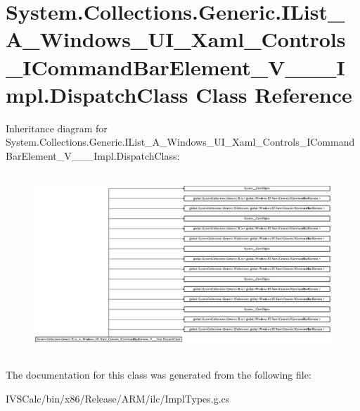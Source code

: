 \hypertarget{class_system_1_1_collections_1_1_generic_1_1_i_list___a___windows___u_i___xaml___controls___i_co238c3369bb34da97e6a9ab7c8bb7116b}{}\section{System.\+Collections.\+Generic.\+I\+List\+\_\+\+A\+\_\+\+Windows\+\_\+\+U\+I\+\_\+\+Xaml\+\_\+\+Controls\+\_\+\+I\+Command\+Bar\+Element\+\_\+\+V\+\_\+\+\_\+\+\_\+\+Impl.\+Dispatch\+Class Class Reference}
\label{class_system_1_1_collections_1_1_generic_1_1_i_list___a___windows___u_i___xaml___controls___i_co238c3369bb34da97e6a9ab7c8bb7116b}
Inheritance diagram for System.\+Collections.\+Generic.\+I\+List\+\_\+\+A\+\_\+\+Windows\+\_\+\+U\+I\+\_\+\+Xaml\+\_\+\+Controls\+\_\+\+I\+Command\+Bar\+Element\+\_\+\+V\+\_\+\+\_\+\+\_\+\+Impl.\+Dispatch\+Class\+:\begin{figure}[H]
\begin{center}
\leavevmode
\includegraphics[height=6.860643cm]{class_system_1_1_collections_1_1_generic_1_1_i_list___a___windows___u_i___xaml___controls___i_co238c3369bb34da97e6a9ab7c8bb7116b}
\end{center}
\end{figure}


The documentation for this class was generated from the following file\+:\begin{DoxyCompactItemize}
\item 
I\+V\+S\+Calc/bin/x86/\+Release/\+A\+R\+M/ilc/Impl\+Types.\+g.\+cs\end{DoxyCompactItemize}
